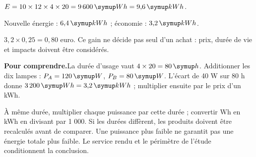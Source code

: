 \par\noindent\begin{minipage}{\linewidth}
\label{cor-defi-15}\begin{questions}
\item $E=10\times12\times4\times20=9\,600\unite{Wh}=9{,}6\unite{kWh}$.
\item Nouvelle énergie : $6{,}4\unite{kWh}$ ; économie : $3{,}2\unite{kWh}$.
\item $3{,}2\times0{,}25=0{,}80$ euro. Ce gain ne décide pas seul d’un achat : prix, durée de vie et impacts doivent être considérés.
\end{questions}
\par\smallskip\noindent\textbf{Pour comprendre.}\enspace La durée d’usage vaut $4\times20=80\unite h$. Additionner les dix lampes : $P_A=120\unite W$, $P_B=80\unite W$. L’écart de 40 W sur 80 h donne $3\,200\unite{Wh}=3{,}2\unite{kWh}$ ; multiplier ensuite par le prix d’un kWh.\par
\end{minipage}
\par\noindent\begin{minipage}{\linewidth}
\label{cor-activite-15}
À même durée, multiplier chaque puissance par cette durée ; convertir Wh en kWh en divisant par 1 000. Si les durées diffèrent, les produits doivent être recalculés avant de comparer. Une puissance plus faible ne garantit pas une énergie totale plus faible. Le service rendu et le périmètre de l’étude conditionnent la conclusion.\par\end{minipage}
